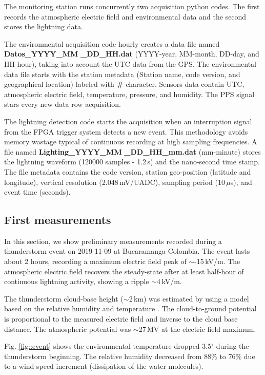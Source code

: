 \documentclass[letterpaper,12pt]{article}
\begin{document}
The monitoring station runs concurrently two acquisition python codes. The first records the atmospheric electric field and environmental data and the second stores the lightning data.

The environmental acquisition code hourly creates a data file named \textbf{Datos\_YYYY\_MM} \textbf{\_DD\_HH.dat} (YYYY-year, MM-month, DD-day, and HH-hour), taking into account the UTC data from the GPS. The environmental data file starts with the station metadata (Station name, code version, and geographical location) labeled with \textbf{#} character. Sensors data contain UTC, atmospheric electric field, temperature, pressure, and humidity. The PPS signal stars every new data row acquisition.

The lightning detection code starts the acquisition when an interruption signal from the FPGA trigger system detects a new event. This methodology avoids memory wastage typical of continuous recording at high sampling frequencies. A file named \textbf{Lighting\_YYYY\_MM} \textbf{\_DD\_HH\_mm.dat} (mm-minute) stores the lightning waveform (120000 samples - 1.2\,s) and the nano-second time stamp. The file metadata contains the code version, station geo-position (latitude and longitude), vertical resolution (2.048\,mV/UADC), sampling period (10\,$\mu$s), and event time (seconds).

\subsection{First measurements}

In this section, we show preliminary measurements recorded during a thunderstorm event on 2019-11-09 at Bucaramanga-Colombia. The event lasts about 2 hours, recording a maximum electric field peak of $\sim$-15\,kV/m. The atmospheric electric field recovers the steady-state after at least half-hour of continuous lightning activity, showing a ripple $\sim$4\,kV/m. 

The thunderstorm cloud-base height ($\sim$2\,km) was estimated by using a model based on the relative humidity and temperature \cite{Lawrence2005}. The cloud-to-ground potential is proportional to the measured electric field and inverse to the cloud base distance. The atmospheric potential was $\sim$27\,MV at the electric field maximum.

Fig. \ref{fig::event} shows the environmental temperature dropped 3.5$^{\circ}$ during the thunderstorm beginning. The relative humidity decreased from 88$\%$ to 76$\%$ due to a wind speed increment (dissipation of the water molecules). 
\end{document}
